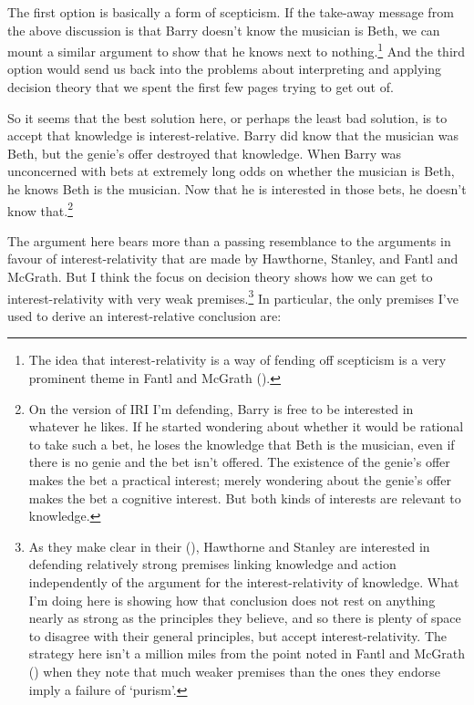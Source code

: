 \documentclass[
  11pt,
  letterpaper,
  DIV=11,
  numbers=noendperiod,
  twoside]{scrartcl}
\begin{document}
The first option is basically a form of scepticism. If the take-away
message from the above discussion is that Barry doesn't know the
musician is Beth, we can mount a similar argument to show that he knows
next to nothing.\footnote{The idea that interest-relativity is a way of
  fending off scepticism is a very prominent theme in Fantl and McGrath
  ().} And the third option would
send us back into the problems about interpreting and applying decision
theory that we spent the first few pages trying to get out of.

So it seems that the best solution here, or perhaps the least bad
solution, is to accept that knowledge is interest-relative. Barry did
know that the musician was Beth, but the genie's offer destroyed that
knowledge. When Barry was unconcerned with bets at extremely long odds
on whether the musician is Beth, he knows Beth is the musician. Now that
he is interested in those bets, he doesn't know that.\footnote{On the
  version of IRI I'm defending, Barry is free to be interested in
  whatever he likes. If he started wondering about whether it would be
  rational to take such a bet, he loses the knowledge that Beth is the
  musician, even if there is no genie and the bet isn't offered. The
  existence of the genie's offer makes the bet a practical interest;
  merely wondering about the genie's offer makes the bet a cognitive
  interest. But both kinds of interests are relevant to knowledge.}

The argument here bears more than a passing resemblance to the arguments
in favour of interest-relativity that are made by Hawthorne, Stanley,
and Fantl and McGrath. But I think the focus on decision theory shows
how we can get to interest-relativity with very weak
premises.\footnote{As they make clear in their
  (), Hawthorne and Stanley are
  interested in defending relatively strong premises linking knowledge
  and action independently of the argument for the interest-relativity
  of knowledge. What I'm doing here is showing how that conclusion does
  not rest on anything nearly as strong as the principles they believe,
  and so there is plenty of space to disagree with their general
  principles, but accept interest-relativity. The strategy here isn't a
  million miles from the point noted in Fantl and McGrath
  () when they note that
  much weaker premises than the ones they endorse imply a failure of
  `purism'.} In particular, the only premises I've used to derive an
interest-relative conclusion are:
\end{document}
